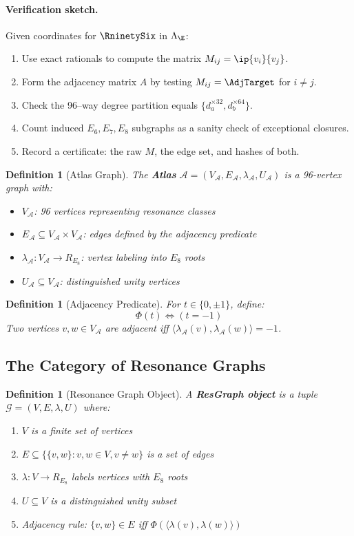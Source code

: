 \documentclass[12pt]{article}
\newtheorem{definition}[theorem]{Definition}
\newcommand{\A}{\mathcal{A}}
\newcommand{\G}{\mathcal{G}}
\newcommand{\PhiAdj}{\Phi}
\begin{document}
\paragraph{Verification sketch.} Given coordinates for \(\RninetySix\) in \(\Lambda_{\E}\):
\begin{enumerate}[nosep]
\item Use exact rationals to compute the matrix \(M_{ij}=\ip{v_i}{v_j}\).
\item Form the adjacency matrix \(A\) by testing \(M_{ij}=\AdjTarget\) for \(i\neq j\).
\item Check the 96–way degree partition equals \(\{d_a^{\times 32}, d_b^{\times 64}\}\).
\item Count induced \(E_6, E_7, E_8\) subgraphs as a sanity check of exceptional closures.
\item Record a certificate: the raw \(M\), the edge set, and hashes of both.
\end{enumerate}

\begin{definition}[Atlas Graph]
The \textbf{Atlas} $\A = (V_\A, E_\A, \lambda_\A, U_\A)$ is a 96-vertex graph with:
\begin{itemize}
\item $V_\A$: 96 vertices representing resonance classes
\item $E_\A \subseteq V_\A \times V_\A$: edges defined by the adjacency predicate
\item $\lambda_\A: V_\A \to R_{E_8}$: vertex labeling into $E_8$ roots
\item $U_\A \subseteq V_\A$: distinguished unity vertices
\end{itemize}
\end{definition}

\begin{definition}[Adjacency Predicate]
For $t \in \{0, \pm1\}$, define:
\[
\PhiAdj(t) \iff (t = -1)
\]
Two vertices $v, w \in V_\A$ are adjacent iff $\langle \lambda_\A(v), \lambda_\A(w) \rangle = -1$.
\end{definition}

\subsection{The Category of Resonance Graphs}

\begin{definition}[Resonance Graph Object]
A \textbf{ResGraph object} is a tuple $\G = (V, E, \lambda, U)$ where:
\begin{enumerate}
\item $V$ is a finite set of vertices
\item $E \subseteq \{\{v,w\} : v,w \in V, v \neq w\}$ is a set of edges
\item $\lambda: V \to R_{E_8}$ labels vertices with $E_8$ roots
\item $U \subseteq V$ is a distinguished unity subset
\item Adjacency rule: $\{v,w\} \in E$ iff $\PhiAdj(\langle \lambda(v), \lambda(w) \rangle)$
\end{enumerate}
\end{definition}
\end{document}
